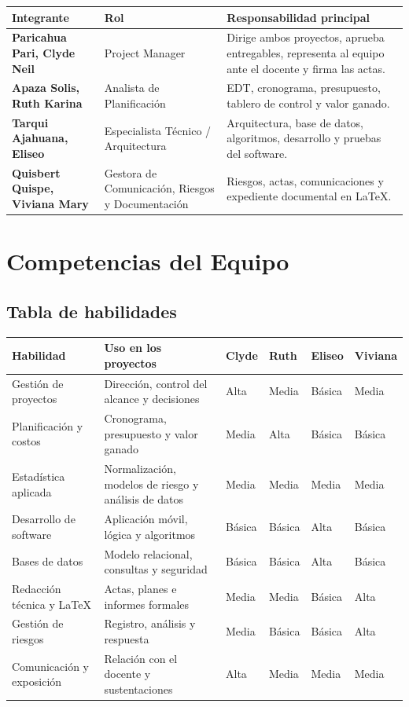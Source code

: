 \documentclass[11pt,a4paper]{article}
\begin{document}
\vspace{0.1cm}
{\small
\noindent\begin{tabularx}{\textwidth}{@{}P{4.4cm} P{3.6cm} L@{}}
\toprule
{}
\textbf{Integrante} & \textbf{Rol} & \textbf{Responsabilidad principal} \\
\midrule
\textbf{Paricahua Pari, Clyde Neil} & Project Manager & Dirige ambos proyectos, aprueba entregables, representa al equipo ante el docente y firma las actas. \\
\textbf{Apaza Solis, Ruth Karina} & Analista de Planificación & EDT, cronograma, presupuesto, tablero de control y valor ganado. \\
\textbf{Tarqui Ajahuana, Eliseo} & Especialista Técnico / Arquitectura & Arquitectura, base de datos, algoritmos, desarrollo y pruebas del software. \\
\textbf{Quisbert Quispe, Viviana Mary} & Gestora de Comunicación, Riesgos y Documentación & Riesgos, actas, comunicaciones y expediente documental en \LaTeX. \\
\bottomrule
\end{tabularx}
}

\section{Competencias del Equipo}

\subsection{Tabla de habilidades}
{\small
\noindent\begin{tabularx}{\textwidth}{@{}P{3.4cm} L C{1.35cm} C{1.35cm} C{1.35cm} C{1.35cm}@{}}
\toprule
{}
\textbf{Habilidad} & \textbf{Uso en los proyectos} & \textbf{Clyde} & \textbf{Ruth} & \textbf{Eliseo} & \textbf{Viviana} \\
\midrule
Gestión de proyectos & Dirección, control del alcance y decisiones & Alta & Media & Básica & Media \\
Planificación y costos & Cronograma, presupuesto y valor ganado & Media & Alta & Básica & Básica \\
Estadística aplicada & Normalización, modelos de riesgo y análisis de datos & Media & Media & Media & Media \\
Desarrollo de software & Aplicación móvil, lógica y algoritmos & Básica & Básica & Alta & Básica \\
Bases de datos & Modelo relacional, consultas y seguridad & Básica & Básica & Alta & Básica \\
Redacción técnica y \LaTeX & Actas, planes e informes formales & Media & Media & Básica & Alta \\
Gestión de riesgos & Registro, análisis y respuesta & Media & Básica & Básica & Alta \\
Comunicación y exposición & Relación con el docente y sustentaciones & Alta & Media & Media & Media \\
\bottomrule
\end{tabularx}
}
\end{document}
